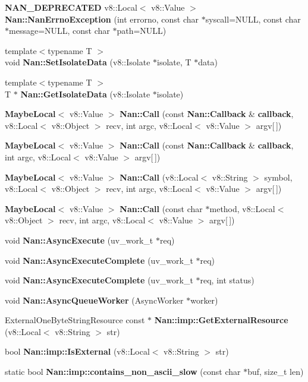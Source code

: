 \begin{DoxyCompactItemize}
\item 
\textbf{ N\+A\+N\+\_\+\+D\+E\+P\+R\+E\+C\+A\+T\+ED} v8\+::\+Local$<$ v8\+::\+Value $>$ \textbf{ Nan\+::\+Nan\+Errno\+Exception} (int errorno, const char $\ast$syscall=N\+U\+LL, const char $\ast$message=N\+U\+LL, const char $\ast$path=N\+U\+LL)
\item 
{\footnotesize template$<$typename T $>$ }\\void \textbf{ Nan\+::\+Set\+Isolate\+Data} (v8\+::\+Isolate $\ast$isolate, T $\ast$data)
\item 
{\footnotesize template$<$typename T $>$ }\\T $\ast$ \textbf{ Nan\+::\+Get\+Isolate\+Data} (v8\+::\+Isolate $\ast$isolate)
\item 
\textbf{ Maybe\+Local}$<$ v8\+::\+Value $>$ \textbf{ Nan\+::\+Call} (const \textbf{ Nan\+::\+Callback} \&\textbf{ callback}, v8\+::\+Local$<$ v8\+::\+Object $>$ recv, int argc, v8\+::\+Local$<$ v8\+::\+Value $>$ argv[$\,$])
\item 
\textbf{ Maybe\+Local}$<$ v8\+::\+Value $>$ \textbf{ Nan\+::\+Call} (const \textbf{ Nan\+::\+Callback} \&\textbf{ callback}, int argc, v8\+::\+Local$<$ v8\+::\+Value $>$ argv[$\,$])
\item 
\textbf{ Maybe\+Local}$<$ v8\+::\+Value $>$ \textbf{ Nan\+::\+Call} (v8\+::\+Local$<$ v8\+::\+String $>$ symbol, v8\+::\+Local$<$ v8\+::\+Object $>$ recv, int argc, v8\+::\+Local$<$ v8\+::\+Value $>$ argv[$\,$])
\item 
\textbf{ Maybe\+Local}$<$ v8\+::\+Value $>$ \textbf{ Nan\+::\+Call} (const char $\ast$method, v8\+::\+Local$<$ v8\+::\+Object $>$ recv, int argc, v8\+::\+Local$<$ v8\+::\+Value $>$ argv[$\,$])
\item 
void \textbf{ Nan\+::\+Async\+Execute} (uv\+\_\+work\+\_\+t $\ast$req)
\item 
void \textbf{ Nan\+::\+Async\+Execute\+Complete} (uv\+\_\+work\+\_\+t $\ast$req)
\item 
void \textbf{ Nan\+::\+Async\+Execute\+Complete} (uv\+\_\+work\+\_\+t $\ast$req, int status)
\item 
void \textbf{ Nan\+::\+Async\+Queue\+Worker} (Async\+Worker $\ast$worker)
\item 
External\+One\+Byte\+String\+Resource const  $\ast$ \textbf{ Nan\+::imp\+::\+Get\+External\+Resource} (v8\+::\+Local$<$ v8\+::\+String $>$ str)
\item 
bool \textbf{ Nan\+::imp\+::\+Is\+External} (v8\+::\+Local$<$ v8\+::\+String $>$ str)
\item 
static bool \textbf{ Nan\+::imp\+::contains\+\_\+non\+\_\+ascii\+\_\+slow} (const char $\ast$buf, size\+\_\+t len)

\end{DoxyCompactItemize}
